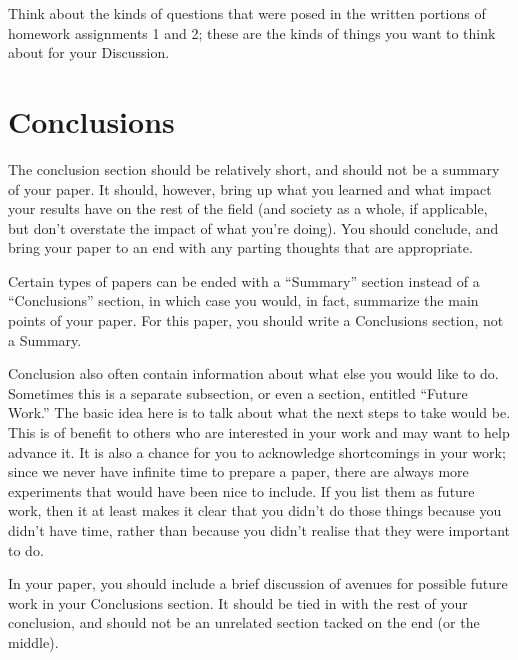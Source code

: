 \documentclass[12pt, letterpaper]{article}
\begin{document}
Think about the kinds of questions that were posed in the written portions of
homework assignments 1 and 2; these are the kinds of things you want to think
about for your Discussion.

\section{Conclusions}
The conclusion section should be relatively short, and should not be a summary
of your paper.  It should, however, bring up what you learned and what impact
your results have on the rest of the field (and society as a whole, if
applicable, but don't overstate the impact of what you're doing).  You should
conclude, and bring your paper to an end with any parting thoughts that are
appropriate.

Certain types of papers can be ended with a ``Summary'' section instead of a
``Conclusions'' section, in which case you would, in fact, summarize the main
points of your paper.  For this paper, you should write a Conclusions section,
not a Summary.

Conclusion also often contain information about what else you would like
to do.  Sometimes this is a separate subsection, or even a section, entitled
``Future Work.''  The basic idea here is to talk about what the next steps to
take would be.  This is of benefit to others who are interested in your
work and may want to help advance it.  It is also a chance for you to
acknowledge shortcomings in your work; since we never have infinite time to
prepare a paper, there are always more experiments that would have been nice to
include.  If you list them as future work, then it at least makes it clear that
you didn't do those things because you didn't have time, rather than because you
didn't realise that they were important to do.

In your paper, you should include a brief discussion of avenues for possible
future work in your Conclusions section.  It should be tied in with the rest of
your conclusion, and should not be an unrelated section tacked on the end (or
the middle).





\end{document}
